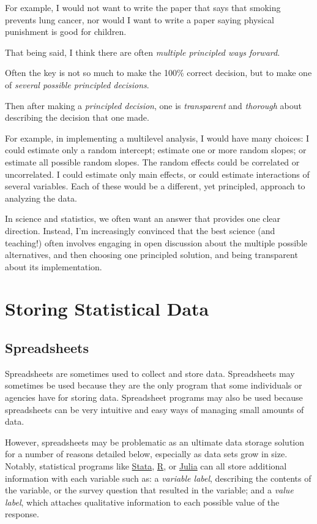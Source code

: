 \documentclass[
  letterpaper,
  DIV=11,
  numbers=noendperiod]{scrreprt}
\begin{document}
For example, I would not want to write the paper that says that smoking
prevents lung cancer, nor would I want to write a paper saying physical
punishment is good for children.

That being said, I think there are often \emph{multiple principled ways
forward}.

Often the key is not so much to make the 100\% correct decision, but to
make one of \emph{several possible principled decisions}.

Then after making a \emph{principled decision}, one is
\emph{transparent} and \emph{thorough} about describing the decision
that one made.

For example, in implementing a multilevel analysis, I would have many
choices: I could estimate only a random intercept; estimate one or more
random slopes; or estimate all possible random slopes. The random
effects could be correlated or uncorrelated. I could estimate only main
effects, or could estimate interactions of several variables. Each of
these would be a different, yet principled, approach to analyzing the
data.

In science and statistics, we often want an answer that provides one
clear direction. Instead, I'm increasingly convinced that the best
science (and teaching!) often involves engaging in open discussion about
the multiple possible alternatives, and then choosing one principled
solution, and being transparent about its implementation.


\chapter{Storing Statistical Data}\label{storing-statistical-data}

\section{Spreadsheets}\label{spreadsheets}

Spreadsheets are sometimes used to collect and store data. Spreadsheets
may sometimes be used because they are the only program that some
individuals or agencies have for storing data. Spreadsheet programs may
also be used because spreadsheets can be very intuitive and easy ways of
managing small amounts of data.

However, spreadsheets may be problematic as an ultimate data storage
solution for a number of reasons detailed below, especially as data sets
grow in size. Notably, statistical programs like
\href{https://www.stata.com/}{Stata},
\href{https://www.r-project.org/}{R}, or
\href{https://julialang.org/}{Julia} can all store additional
information with each variable such as: a \emph{variable label},
describing the contents of the variable, or the survey question that
resulted in the variable; and a \emph{value label}, which attaches
qualitative information to each possible value of the response.
\end{document}
